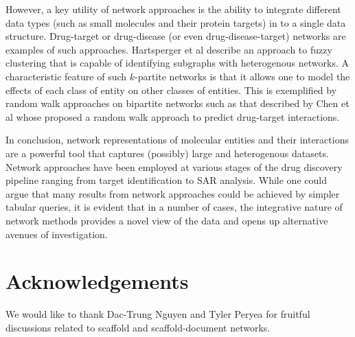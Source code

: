 \documentclass[]{book}
\begin{document}
However, a key utility of network approaches is the ability to
integrate different data types (such as small molecules and their
protein targets) in to a single data structure. Drug-target or
drug-disease (or even drug-disease-target) networks are examples of
such approaches. Hartsperger et al \cite{Hartsperger:2010yg} describe
an approach to fuzzy clustering that is capable of identifying
subgraphs with heterogenous networks. A characteristic feature of such
$k$-partite networks is that it allows one to model the effects of
each class of entity on other classes of entities. This is exemplified
by random walk approaches on bipartite networks such as that described
by Chen et al \cite{Chen:2012qy} whose proposed a random walk approach
to predict drug-target interactions.

In conclusion, network representations of molecular entities and their
interactions are a powerful tool that captures (possibly) large and
heterogenous datasets. Network approaches have been employed at
various stages of the drug discovery pipeline ranging from target
identification to SAR analysis. While one could argue that many
results from network approaches could be achieved by simpler tabular
queries, it is evident that in a number of cases, the integrative
nature of network methods provides a novel view of the data and opens
up alternative avenues of investigation.

\section{Acknowledgements}
\label{sec:acknowledgements}

We would like to thank Dac-Trung Nguyen and Tyler Peryea for fruitful
discussions related to scaffold and scaffold-document networks.


\end{document}
